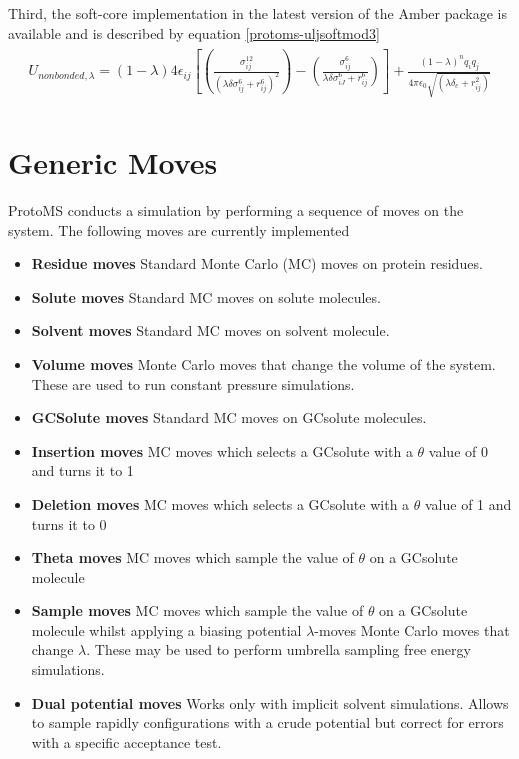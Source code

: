 \documentclass[letterpaper,10pt,english]{sphinxmanual}
\begin{document}
Third, the soft-core implementation in the latest version of the Amber package is available and is described by equation \eqref{protoms-uljsoftmod3}
\label{protoms:equation-uljsoftmod3}\begin{gather}
\begin{split}U_{non bonded,\lambda}= (1-\lambda) 4{\epsilon}_{ij} \left[ \left( \frac{ \sigma_{ij}^{12} }{ ( \lambda \delta \sigma_{ij}^6 + r_{ij}^{6} )^{2}} \right) - \left( \frac{ \sigma_{ij}^{6} }{ \lambda \delta \sigma_{iJ}^6 + r_{ij}^{6} } \right) \right] +  \frac{(1-\lambda)^{n} q_{i}q_{j}} {4\pi{\epsilon}_{0} \sqrt{( \lambda \delta_c +  r_{ij}^{2})}}\end{split}\label{protoms-uljsoftmod3}
\end{gather}

\section{Generic Moves}
\label{protoms:generic-moves}\label{protoms:moves}
ProtoMS conducts a simulation by performing a sequence of moves on the system. The following moves are currently implemented
\begin{itemize}
\item {} 
\textbf{Residue moves} Standard Monte Carlo (MC) moves on protein residues.

\item {} 
\textbf{Solute moves} Standard MC moves on solute molecules.

\item {} 
\textbf{Solvent moves} Standard MC moves on solvent molecule.

\item {} 
\textbf{Volume moves} Monte Carlo moves that change the volume of the system. These are used to run constant pressure simulations.

\item {} 
\textbf{GCSolute moves} Standard MC moves on GCsolute molecules.

\item {} 
\textbf{Insertion moves} MC moves which selects a GCsolute with a \(\theta\) value of 0 and turns it to 1

\item {} 
\textbf{Deletion moves} MC moves which selects a GCsolute with a \(\theta\) value of 1 and turns it to 0

\item {} 
\textbf{Theta moves} MC moves which sample the value of \(\theta\) on a GCsolute molecule

\item {} 
\textbf{Sample moves} MC moves which sample the value of \(\theta\) on a GCsolute molecule whilst applying a biasing potential \(\lambda\)-moves Monte Carlo moves that change \(\lambda\). These may be used to perform umbrella sampling free energy simulations.

\item {} 
\textbf{Dual potential moves} Works only with implicit solvent simulations. Allows to sample rapidly configurations with a crude potential but correct for errors with a specific acceptance test.

\end{itemize}
\end{document}
